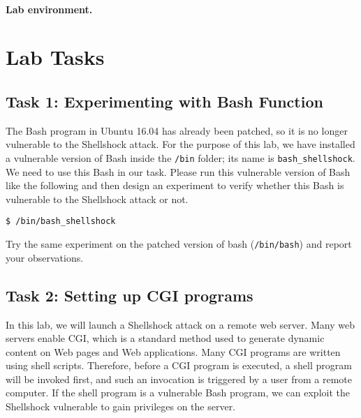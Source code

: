 \paragraph{Lab environment.} \seedenvironment




\section{Lab Tasks}


\subsection{Task 1: Experimenting with Bash Function}


The Bash program in Ubuntu 16.04 has already been patched, so it is no
longer vulnerable to the Shellshock attack. For the purpose of this lab, we
have installed a vulnerable version of Bash inside the \texttt{/bin}
folder; its name is \texttt{bash\_shellshock}. We need to use 
this Bash in our task. Please run this vulnerable version of Bash like the
following and then design an experiment to verify whether this Bash is
vulnerable to the Shellshock attack or not. 

\begin{lstlisting}
$ /bin/bash_shellshock
\end{lstlisting}
 

Try the same experiment on the patched version of bash (\texttt{/bin/bash})
and report your observations.



\subsection{Task 2: Setting up CGI programs}

In this lab, we will launch a Shellshock attack on a remote web server. 
Many web servers enable CGI, which is a standard method used to generate 
dynamic content on Web pages and Web applications. Many CGI programs are 
written using shell scripts. Therefore, before a CGI program is executed,
a shell program will be invoked first, and such an invocation is
triggered by a user from a remote computer. If the shell program is 
a vulnerable Bash program, we can exploit the Shellshock vulnerable to 
gain privileges on the server. 


